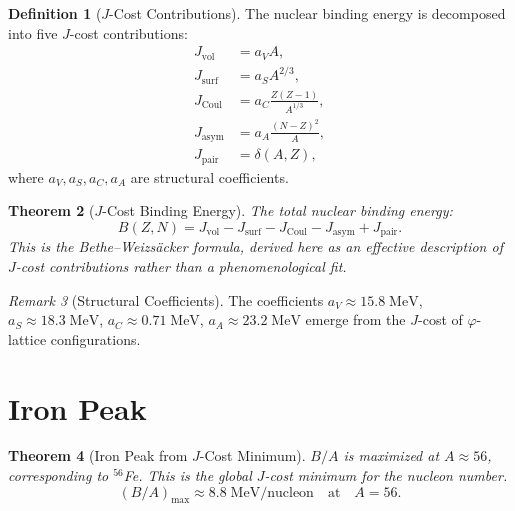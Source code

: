 \documentclass[12pt,a4paper]{article}
\newtheorem{theorem}{Theorem}[section]
\theoremstyle{definition}
\newtheorem{definition}[theorem]{Definition}
\theoremstyle{remark}
\newtheorem{remark}[theorem]{Remark}
\begin{document}
\begin{definition}[$J$-Cost Contributions]
The nuclear binding energy is decomposed into five $J$-cost
contributions:
\begin{align}
  J_{\mathrm{vol}} &= a_V A, \\
  J_{\mathrm{surf}} &= a_S A^{2/3}, \\
  J_{\mathrm{Coul}} &= a_C \frac{Z(Z-1)}{A^{1/3}}, \\
  J_{\mathrm{asym}} &= a_A \frac{(N-Z)^2}{A}, \\
  J_{\mathrm{pair}} &= \delta(A, Z),
\end{align}
where $a_V, a_S, a_C, a_A$ are structural coefficients.
\end{definition}

\begin{theorem}[$J$-Cost Binding Energy]
\label{thm:binding}
The total nuclear binding energy:
\begin{equation}
  \boxed{B(Z, N) = J_{\mathrm{vol}} - J_{\mathrm{surf}} -
  J_{\mathrm{Coul}} - J_{\mathrm{asym}} +
  J_{\mathrm{pair}}.}
\end{equation}
This is the Bethe--Weizs\"acker formula, derived here as an
effective description of $J$-cost contributions rather than a
phenomenological fit.
\end{theorem}

\begin{remark}[Structural Coefficients]
The coefficients $a_V \approx 15.8\;\mathrm{MeV}$,
$a_S \approx 18.3\;\mathrm{MeV}$,
$a_C \approx 0.71\;\mathrm{MeV}$,
$a_A \approx 23.2\;\mathrm{MeV}$ emerge from the $J$-cost of
$\varphi$-lattice configurations.
\end{remark}

\section{Iron Peak}
\label{sec:iron}

\begin{theorem}[Iron Peak from $J$-Cost Minimum]
\label{thm:iron}
$B/A$ is maximized at $A \approx 56$, corresponding to ${}^{56}$Fe.
This is the global $J$-cost minimum for the nucleon number.
\begin{equation}
  \boxed{(B/A)_{\max} \approx 8.8\;\mathrm{MeV/nucleon}
  \quad \text{at} \quad A = 56.}
\end{equation}
\end{theorem}
\end{document}
